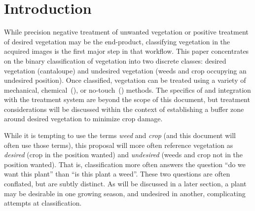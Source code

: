 \documentclass[letterpaper]{article}
\begin{document}
\section{Introduction}
While precision negative treatment of unwanted vegetation or positive treatment of desired vegetation may be the end-product, classifying vegetation in the acquired images is the first major step in that workflow. This paper concentrates on the binary classification of vegetation into two discrete classes: desired vegetation (cantaloupe) and undesired vegetation (weeds and crop occupying an undesired position). Once classified, vegetation can be treated using a variety of mechanical, chemical~(\cite{Saile2022-vu}), or no-touch~(\cite{Saile2022-vu,Mwitta2022-yt}) methods. The specifics of and integration with the treatment system are beyond the scope of this document, but treatment considerations will be discussed within the context of establishing a buffer zone around desired vegetation to minimize crop damage.

While it is tempting to use the terms \textit{weed} and \textit{crop} (and this document will often use those terms), this proposal will more often reference vegetation as \textit{desired} (crop in the position wanted) and \textit{undesired} (weeds and crop not in the position wanted).  That is, classification more often answers the question ``do we want this plant'' than ``is this plant a weed''. These two questions are often conflated, but are subtly distinct. As will be discussed in a later section, a plant may be desirable in one growing season, and undesired in another, complicating attempts at classification.
\end{document}
